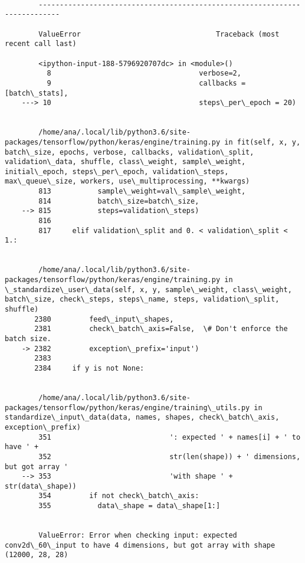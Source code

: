 \documentclass[11pt]{article}
\begin{document}
    \begin{Verbatim}[commandchars=\\\{\}]

        ---------------------------------------------------------------------------

        ValueError                                Traceback (most recent call last)

        <ipython-input-188-5796920707dc> in <module>()
          8                                   verbose=2,
          9                                   callbacks = [batch\_stats],
    ---> 10                                   steps\_per\_epoch = 20)
    

        /home/ana/.local/lib/python3.6/site-packages/tensorflow/python/keras/engine/training.py in fit(self, x, y, batch\_size, epochs, verbose, callbacks, validation\_split, validation\_data, shuffle, class\_weight, sample\_weight, initial\_epoch, steps\_per\_epoch, validation\_steps, max\_queue\_size, workers, use\_multiprocessing, **kwargs)
        813           sample\_weight=val\_sample\_weight,
        814           batch\_size=batch\_size,
    --> 815           steps=validation\_steps)
        816 
        817     elif validation\_split and 0. < validation\_split < 1.:


        /home/ana/.local/lib/python3.6/site-packages/tensorflow/python/keras/engine/training.py in \_standardize\_user\_data(self, x, y, sample\_weight, class\_weight, batch\_size, check\_steps, steps\_name, steps, validation\_split, shuffle)
       2380         feed\_input\_shapes,
       2381         check\_batch\_axis=False,  \# Don't enforce the batch size.
    -> 2382         exception\_prefix='input')
       2383 
       2384     if y is not None:


        /home/ana/.local/lib/python3.6/site-packages/tensorflow/python/keras/engine/training\_utils.py in standardize\_input\_data(data, names, shapes, check\_batch\_axis, exception\_prefix)
        351                            ': expected ' + names[i] + ' to have ' +
        352                            str(len(shape)) + ' dimensions, but got array '
    --> 353                            'with shape ' + str(data\_shape))
        354         if not check\_batch\_axis:
        355           data\_shape = data\_shape[1:]


        ValueError: Error when checking input: expected conv2d\_60\_input to have 4 dimensions, but got array with shape (12000, 28, 28)

    \end{Verbatim}
\end{document}
